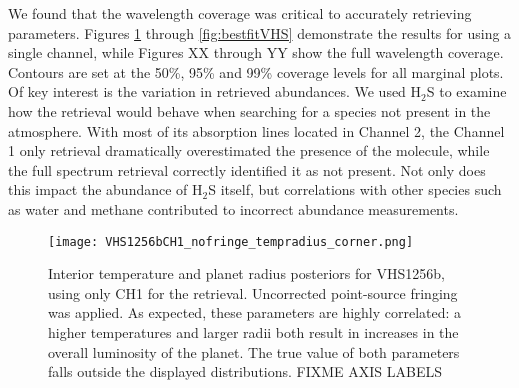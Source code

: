 We found that the wavelength coverage was critical to accurately retrieving parameters. Figures \ref{fig:postVHS_tr} through \ref{fig:bestfitVHS} demonstrate the results for using a single channel, while Figures XX through YY show the full wavelength coverage.
Contours are set at the 50\%, 95\% and 99\% coverage levels for all marginal plots.
Of key interest is the variation in retrieved abundances.
We used H$_{2}$S to examine how the retrieval would behave when searching for a species not present in the atmosphere. 
With most of its absorption lines located in Channel 2, the Channel 1 only retrieval dramatically overestimated the presence of the molecule, while the full spectrum retrieval correctly identified it as not present.
Not only does this impact the abundance of H$_{2}$S itself, but correlations with other species such as water and methane contributed to incorrect abundance measurements.
\begin{figure}[t]
	\centering
	\texttt{[image: VHS1256bCH1\_nofringe\_tempradius\_corner.png]}
	\caption{Interior temperature and planet radius posteriors for VHS1256b, using only CH1 for the retrieval. Uncorrected point-source fringing was applied. As expected, these parameters are highly correlated: a higher temperatures and larger radii both result in increases in the overall luminosity of the planet. The true value of both parameters falls outside the displayed distributions. FIXME AXIS LABELS}
	\label{fig:postVHS_tr}
\end{figure}

